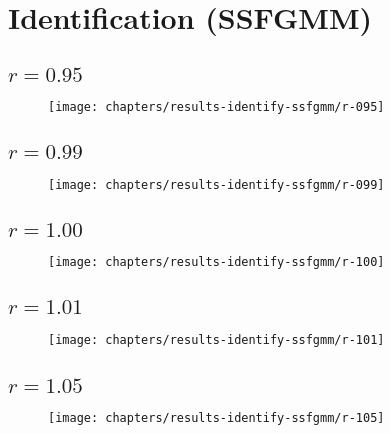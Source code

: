 \chapter{Identification (SSFGMM)}
\label{apx:results-identify-ssfgmm}

\section{$r = 0.95$}



\begin{figure}[ht]
	\centering
	\texttt{[image: chapters/results-identify-ssfgmm/r-095]}
	\label{fig:r-095}
\end{figure}

\newpage
\section{$r = 0.99$}



\begin{figure}[ht]
	\centering
	\texttt{[image: chapters/results-identify-ssfgmm/r-099]}
	\label{fig:r-099}
\end{figure}

\newpage
\section{$r = 1.00$}



\begin{figure}[ht]
	\centering
	\texttt{[image: chapters/results-identify-ssfgmm/r-100]}
	\label{fig:r-100}
\end{figure}

\newpage
\section{$r = 1.01$}



\begin{figure}[ht]
	\centering
	\texttt{[image: chapters/results-identify-ssfgmm/r-101]}
	\label{fig:r-101}
\end{figure}

\newpage
\section{$r = 1.05$}



\begin{figure}[ht]
	\centering
	\texttt{[image: chapters/results-identify-ssfgmm/r-105]}
	\label{fig:r-105}
\end{figure}
